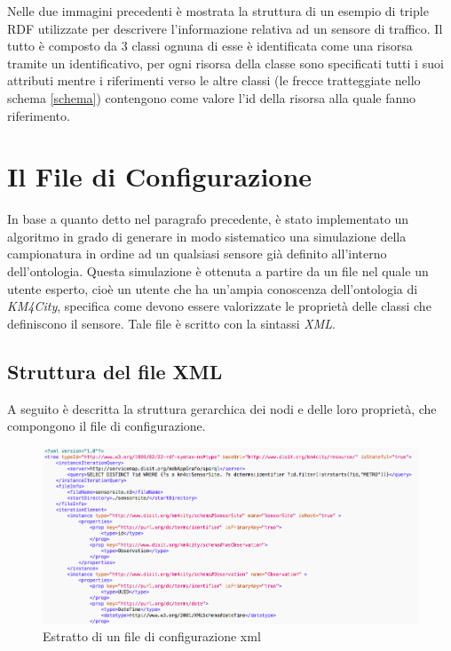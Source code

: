 \documentclass[12pt,a4paper,italian]{article}
\begin{document}
Nelle due immagini precedenti è mostrata la struttura di un esempio di triple RDF utilizzate per descrivere l'informazione relativa ad un sensore di traffico. Il tutto è composto da 3 classi ognuna di esse è identificata come una risorsa tramite un identificativo, per ogni risorsa della classe sono specificati tutti i suoi attributi mentre i riferimenti verso le altre classi (le frecce tratteggiate nello schema \ref{schema}) contengono come valore l'id della risorsa alla quale fanno riferimento. 
\newpage

\section{Il File di Configurazione}
In base a quanto detto nel paragrafo precedente, è stato implementato  un algoritmo in grado di generare in modo sistematico una simulazione della campionatura in ordine ad un qualsiasi  sensore già definito all'interno dell'ontologia.
Questa simulazione è ottenuta a partire da un file nel quale un utente esperto, cioè un utente che ha un'ampia conoscenza dell'ontologia di \emph{KM4City}, specifica come devono essere valorizzate le proprietà 
delle classi che definiscono il sensore. Tale file è scritto con la sintassi \emph{XML}.

\subsection{Struttura del file XML}
A seguito è descritta la struttura gerarchica dei nodi e delle loro proprietà, che compongono il file di configurazione.\\

\begin{figure}[h!]
	\centering
	\includegraphics[width=14cm]{img/configxml.png}
	\caption{Estratto di un file di configurazione xml}\label{configxml}
\end{figure}
\end{document}

